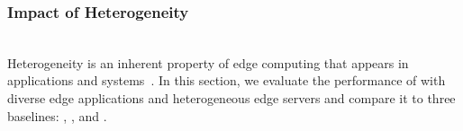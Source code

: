 






\subsubsection{Impact of Heterogeneity}\label{sec:eval_hetero}\hfill\\
Heterogeneity is an inherent property of edge computing that appears in applications and systems~\cite{HeteroEdge}. In this section, we evaluate the performance of \proposedsystem with diverse edge applications and heterogeneous edge servers and compare it to three baselines: \latencyaware, \energyaware, and \intensityaware.

